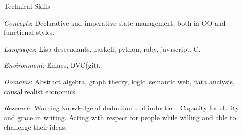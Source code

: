\begin{rubric}{Technical Skills}{


  \entry* \emph{Concepts}: Declarative and
  imperative state management, both in OO and functional
  styles.

  \entry* \emph{Languages}: Lisp descendants, haskell, python, ruby, javascript, C.

  \entry* \emph{Environment}: Emacs, DVC(git).

  \entry* \emph{Domains}: Abstract algebra, graph theory, logic,
semantic web, data analysis, causal realist economics.

  \entry* \emph{Research}: Working knowledge of deduction and
  induction. Capacity for clarity and grace in writing. Acting with
  respect for people while willing and able to challenge their ideas.

}\end{rubric}
